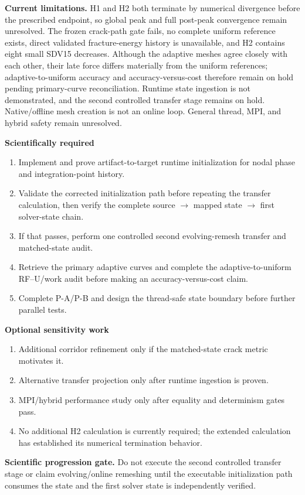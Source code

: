 \documentclass[11pt,a4paper]{article}
\newcommand{\boxx}[2]{\colorbox{#1}{\parbox{\dimexpr\linewidth-2\fboxsep}{#2}}}
\newcommand{\headx}[1]{{\color{navy}\fontsize{17}{20}\selectfont\bfseries #1}\par\vspace{1.5mm}{\color{blue}\rule{\linewidth}{1.1pt}}\vspace{3mm}}
\begin{document}
\clearpage\headx{11. Limitations and the next 2--4 weeks}
\textbf{Current limitations.} H1 and H2 both terminate by numerical divergence before the prescribed endpoint, so global peak and full post-peak convergence remain unresolved. The frozen crack-path gate fails, no complete uniform reference exists, direct validated fracture-energy history is unavailable, and H2 contains eight small SDV15 decreases. Although the adaptive meshes agree closely with each other, their late force differs materially from the uniform references; adaptive-to-uniform accuracy and accuracy-versus-cost therefore remain on hold pending primary-curve reconciliation. Runtime state ingestion is not demonstrated, and the second controlled transfer stage remains on hold. Native/offline mesh creation is not an online loop. General thread, MPI, and hybrid safety remain unresolved.

\begin{minipage}[t]{.48\linewidth}
\boxx{pb}{\textbf{Scientifically required}
\begin{enumerate}
\item Implement and prove artifact-to-target runtime initialization for nodal phase and integration-point history.
\item Validate the corrected initialization path before repeating the transfer calculation, then verify the complete source $\rightarrow$ mapped state $\rightarrow$ first solver-state chain.
\item If that passes, perform one controlled second evolving-remesh transfer and matched-state audit.
\item Retrieve the primary adaptive curves and complete the adaptive-to-uniform RF--U/work audit before making an accuracy-versus-cost claim.
\item Complete P-A/P-B and design the thread-safe state boundary before further parallel tests.
\end{enumerate}}
\end{minipage}\hfill
\begin{minipage}[t]{.48\linewidth}
\boxx{pa}{\textbf{Optional sensitivity work}
\begin{enumerate}
\item Additional corridor refinement only if the matched-state crack metric motivates it.
\item Alternative transfer projection only after runtime ingestion is proven.
\item MPI/hybrid performance study only after equality and determinism gates pass.
\item No additional H2 calculation is currently required; the extended calculation has established its numerical termination behavior.
\end{enumerate}}
\end{minipage}
\boxx{pr}{\textbf{Scientific progression gate.} Do not execute the second controlled transfer stage or claim evolving/online remeshing until the executable initialization path consumes the state and the first solver state is independently verified.}
\end{document}
